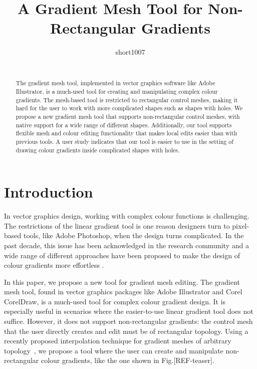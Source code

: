 \documentclass{egpubl}
\title[Non-rectangular gradient mesh tool]
	{A Gradient Mesh Tool for Non-Rectangular Gradients}
\author[short1007]
{\parbox{\textwidth}{\centering short1007}
        \\
	{\parbox{\textwidth}{\centering } }
}
\begin{document}

\maketitle

\begin{abstract}
The gradient mesh tool, implemented in vector graphics software like Adobe Illustrator, is a much-used tool for creating and manipulating complex colour gradients. The mesh-based tool is restricted to rectangular control meshes, making it hard for the user to work with more complicated shapes such as shapes with holes. We propose a new gradient mesh tool that supports non-rectangular control meshes, with native support for a wide range of different shapes. Additionally, our tool supports flexible mesh and colour editing functionality that makes local edits easier than with previous tools. A user study indicates that our tool is easier to use in the setting of drawing colour gradients inside complicated shapes with holes.

\begin{classification} %
\end{classification}

\end{abstract}

\section{Introduction}
\label{sec:intro}

In vector graphics design, working with complex colour functions is challenging. The restrictions of the linear gradient tool is one reason designers turn to pixel-based tools, like Adobe Photoshop, when the design turns complicated. In the past decade, this issue has been acknowledged in the research community and a wide range of different approaches have been proposed to make the design of colour gradients more effortless \cite{Orzan:2008,Lopez-Moreno:2013}.

In this paper, we propose a new tool for gradient mesh editing. The gradient mesh tool, found in vector graphics packages like Adobe Illustrator and Corel CorelDraw, is a much-used tool for complex colour gradient design. It is especially useful in scenarios where the easier-to-use linear gradient tool does not suffice. However, it does not support non-rectangular gradients: the control mesh that the user directly creates and edit must be of rectangular topology. Using a recently proposed interpolation technique for gradient meshes of arbitrary topology~\cite{Lieng:2016}, we propose a tool where the user can create and manipulate non-rectangular colour gradients, like the one shown in Fig.[REF-teaser].
\end{document}
